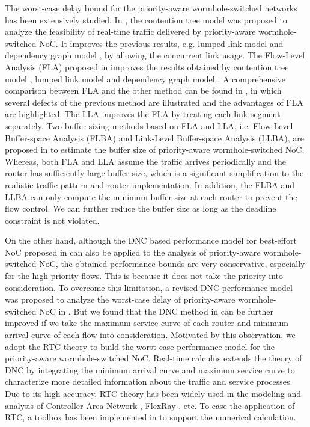\documentclass[preprint]{elsarticle}
\begin{document}
The worst-case delay bound for the priority-aware wormhole-switched networks has been extensively studied. In \cite{LuJS05}, the contention tree model was proposed to analyze the feasibility of real-time traffic delivered by priority-aware wormhole-switched NoC. It improves the previous results, e.g. lumped link model \cite{707545} and dependency graph model \cite{708526}, by allowing the concurrent link usage. The Flow-Level Analysis (FLA) proposed in \cite{Shi:2008:RCA:1397757.1397996} improves the results obtained by contention tree model \cite{LuJS05}, lumped link model \cite{707545} and dependency graph model \cite{708526}. A comprehensive comparison between FLA and the other method can be found in \cite{Shi2009}, in which several defects of the previous method are illustrated and the advantages of FLA are highlighted. The LLA \cite{73} improves the FLA by treating each link segment separately. Two buffer sizing methods based on FLA and LLA, i.e. Flow-Level Buffer-space Analysis (FLBA) and Link-Level Buffer-space Analysis (LLBA), are proposed in \cite{189} to estimate the buffer size of priority-aware wormhole-switched NoC. Whereas, both FLA and LLA assume the traffic arrives periodically and the router has sufficiently large buffer size, which is a significant simplification to the realistic traffic pattern and router implementation. In addition, the FLBA and LLBA can only compute the minimum buffer size at each router to prevent the flow control. We can further reduce the buffer size as long as the deadline constraint is not violated.

On the other hand, although the DNC based performance model for best-effort NoC proposed in \cite{qian2009analysis} can also be applied to the analysis of priority-aware wormhole-switched NoC, the obtained performance bounds are very conservative, especially for the high-priority flows. This is because it does not take the priority into consideration. To overcome this limitation, a revised DNC performance model was proposed to analyze the worst-case delay of priority-aware wormhole-switched NoC in \cite{Qian489900}. But we found that the DNC method in \cite{Qian489900} can be further improved if we take the maximum service curve of each router and minimum arrival curve of each flow into consideration. Motivated by this observation, we adopt the RTC theory \cite{1253607} to build the worst-case performance model for the priority-aware wormhole-switched NoC. Real-time calculus extends the theory of DNC \cite{Boudec2001Network} by integrating the minimum arrival curve and maximum service curve to characterize more detailed information about the traffic and service processes. Due to its high accuracy, RTC theory has been widely used in the modeling and analysis of Controller Area Network \cite{4617308}, FlexRay \cite{Hagiescu:2007:PAF:1278480.1278554}, etc. To ease the application of RTC, a toolbox has been implemented in \cite{rtc} to support the numerical calculation.
\end{document}
